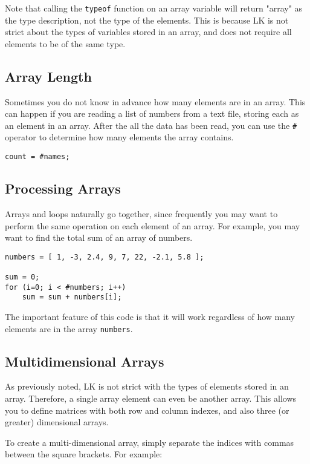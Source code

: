 \documentclass{article}
\begin{document}
Note that calling the \texttt{typeof} function on an array variable will return "array" as the type description, not the type of the elements.  This is because LK is not strict about the types of variables stored in an array, and does not require all elements to be of the same type.

\subsection{Array Length}

Sometimes you do not know in advance how many elements are in an array.  This can happen if you are reading a list of numbers from a text file, storing each as an element in an array.  After the all the data has been read, you can use the \texttt{\#} operator to determine how many elements the array contains.

\begin{verbatim}
count = #names;
\end{verbatim}

\subsection{Processing Arrays}

Arrays and loops naturally go together, since frequently you may want to perform the same operation on each element of an array.  For example, you may want to find the total sum of an array of numbers.

\begin{verbatim}
numbers = [ 1, -3, 2.4, 9, 7, 22, -2.1, 5.8 ];

sum = 0;
for (i=0; i < #numbers; i++)
    sum = sum + numbers[i];
\end{verbatim}

The important feature of this code is that it will work regardless of how many elements are in the array \texttt{numbers}.

\subsection{Multidimensional Arrays}

As previously noted, LK is not strict with the types of elements stored in an array.  Therefore, a single array element can even be another array.  This allows you to define matrices with both row and column indexes, and also three (or greater) dimensional arrays.

To create a multi-dimensional array, simply separate the indices with commas between the square brackets.  For example:
\end{document}
